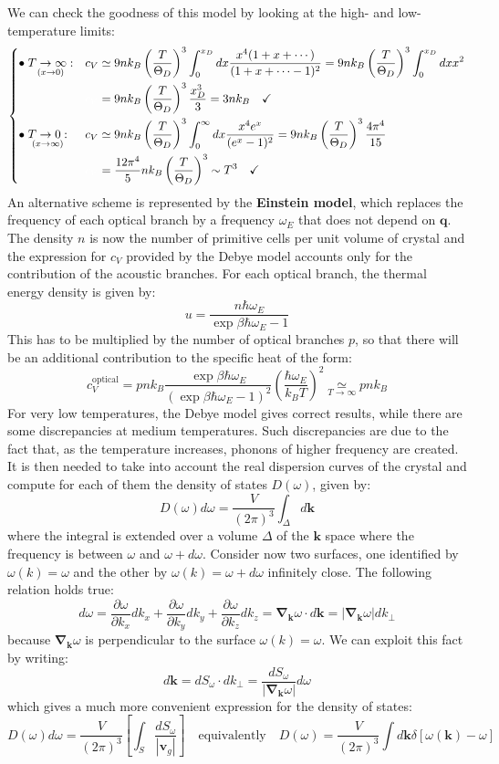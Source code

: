 \documentclass[10.75pt,a4paper,openright,bottom=2cm]{article}
\renewcommand{\Vec}[1]{\boldsymbol{#1}}
\begin{document}
We can check the goodness of this model by looking at the high- and low-temperature limits:
\[
\left\{
\begin{aligned}
&\bullet\underset{(x\to0)}{T\to\infty:}&&c_V\simeq9nk_B\left(\frac{T}{\Theta_D}\right)^3\int_0^{x_D}dx\frac{x^4(1+x+\cdots)}{(1+x+\cdots-1)^2}=9nk_B\left(\frac{T}{\Theta_D}\right)^3\int_0^{x_D}dxx^2\\
& &&{\color{white}{c_V}}=9nk_B\left(\frac{T}{\Theta_D}\right)^3\frac{x_D^3}{3}=3nk_B \quad \checkmark\\
&\bullet\underset{(x\to\infty)}{T\to0:}&&c_V\simeq9nk_B\left(\frac{T}{\Theta_D}\right)^3\int_0^\infty dx\frac{x^4e^x}{(e^x-1)^2}=9nk_B\left(\frac{T}{\Theta_D}\right)^3\frac{4\pi^4}{15}\\
& &&{\color{white}{c_V}}=\frac{12\pi^4}{5}nk_B\left(\frac{T}{\Theta_D}\right)^3\sim T^3 \quad \checkmark
\end{aligned}
\right.
\]
An alternative scheme is represented by the \textbf{Einstein model}, which replaces the frequency of each optical branch by a frequency $\omega_E$ that does not depend on $\Vec{q}$. The density $n$ is now the number of primitive cells per unit volume of crystal and the expression for $c_V$ provided by the Debye model accounts only for the contribution of the acoustic branches. For each optical branch, the thermal energy density is given by:
\[
u=\frac{n\hbar\omega_E}{\exp{\beta\hbar\omega_E}-1}
\]
This has to be multiplied by the number of optical branches $p$, so that there will be an additional contribution to the specific heat of the form:
\[
c_V^{\text{optical}}=pnk_B\frac{\exp{\beta\hbar\omega_E}}{(\exp{\beta\hbar\omega_E}-1)^2}\left(\frac{\hbar\omega_E}{k_BT}\right)^2\underset{T\to\infty}{\simeq}pnk_B
\]
For very low temperatures, the Debye model gives correct results, while there are some discrepancies at medium temperatures. Such discrepancies are due to the fact that, as the temperature increases, phonons of higher frequency are created. It is then needed to take into account the real dispersion curves of the crystal and compute for each of them the density of states $D(\omega)$, given by:
\[
D(\omega)d\omega=\frac{V}{(2\pi)^3}\int_\Delta d\Vec{k}
\]
where the integral is extended over a volume $\Delta$ of the $\Vec{k}$ space where the frequency is between $\omega$ and $\omega+d\omega$. Consider now two surfaces, one identified by $\omega(k)=\omega$ and the other by $\omega(k)=\omega+d\omega$ infinitely close. The following relation holds true:
\[
d\omega=\frac{\partial\omega}{\partial k_x}dk_x+\frac{\partial\omega}{\partial k_y}dk_y+\frac{\partial\omega}{\partial k_z}dk_z=\Vec{\nabla}_{\Vec{k}}\omega\cdot d\Vec{k}=|\Vec{\nabla}_{\Vec{k}}\omega|dk_\perp
\]
because $\Vec{\nabla}_{\Vec{k}}\omega$ is perpendicular to the surface $\omega(k)=\omega$. We can exploit this fact by writing: 
\[
d\Vec{k}=dS_\omega\cdot dk_\perp=\frac{dS_\omega}{|\Vec{\nabla}_{\Vec{k}}\omega|}d\omega
\]
which gives a much more convenient expression for the density of states:
\[
D(\omega)d\omega=\frac{V}{(2\pi)^3}\left[\int_S\frac{dS_\omega}{|\Vec{v}_g|}\right] \quad \text{equivalently} \quad D(\omega)=\frac{V}{(2\pi)^3}\int d\Vec{k}\delta[\omega(\Vec{k})-\omega]
\]
\end{document}
